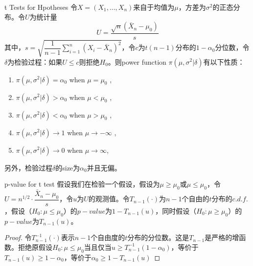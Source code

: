 \documentclass[../main.tex]{subfiles}
\begin{document}
\begin{corollary}{t Tests for Hpotheses}
令$X=(X_1, \dots, X_n)$来自于均值为$\mu$，方差为$\sigma^2$的正态分布。令$U$为统计量
\begin{equation}\label{}
U=\dfrac{\sqrt{n}(\bar{X}_n-\mu_0)}{s}
\end{equation}
其中，$s=\sqrt{\dfrac{1}{n-1}\sum\limits_{i=1}^{n}(X_i-\bar{X}_n)^2}$，令$c$为$t(n-1)$分布的$1-\alpha_0$分位数，令$\delta$为检验过程：如果$U\leqslant c$则拒绝$H_0$。则power function $\pi(\mu, \sigma^2|\delta)$有以下性质：

\begin{enumerate}
\item $\pi(\mu, \sigma^2|\delta) = \alpha_0$ when $\mu = \mu_0$ \label{item-1},
\item $\pi(\mu, \sigma^2|\delta) > \alpha_0$ when $\mu < \mu_0$ \label{item-2},
\item $\pi(\mu, \sigma^2|\delta) < \alpha_0$ when $\mu > \mu_0$ \label{item-3},
\item $\pi(\mu, \sigma^2|\delta) \rightarrow 1$ when $\mu \rightarrow -\infty$ \label{item-4},
\item $\pi(\mu, \sigma^2|\delta) \rightarrow 0$ when $\mu \rightarrow \infty \label{item-5}$,
\end{enumerate}
另外，检验过程$\delta$的size为$\alpha_0$并且无偏。
\end{corollary}

\begin{theorem}{p-value for t test}{}
假设我们在检验一个假设，假设为$\mu\geqslant\mu_0$或$\mu\leqslant\mu_0$，令$U=n^{1/2}\cdot\dfrac{\bar{X}_n-\mu_0}{s}$，令$u$为$U$的观测值。令$T_{n-1}(\cdot)$为$n-1$个自由的$t$分布的$c.d.f.$，假设（$H_0: \mu\leqslant\mu_0$）的$p-value$为$1-T_{n-1}(u)$，同时假设（$H_0:\mu\geqslant\mu_0$）的$p-value$为$T_{n-1}(u)$。
\end{theorem}
\begin{proof}
令$T_{n-1}^{-1}(\cdot)$表示$n-1$个自由度的$t$分布的分位数。这是$T_{n-1}$是严格的增函数。拒绝原假设$H_0: \mu\leqslant\mu_0$当且仅当$u\geqslant T_{n-1}^{-1}(1-\alpha_0)$，等价于$T_{n-1}(u)\geqslant1-\alpha_0$，等价于$\alpha_0\geqslant1-T_{n-1}(u)$
\end{proof}
\end{document}
